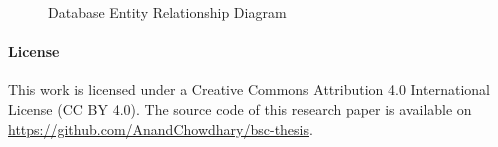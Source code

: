 \documentclass{article}
\begin{document}
\begin{figure}[!hb]
  \caption{Database Entity Relationship Diagram}
\end{figure}

\newpage



\paragraph{License} This work is licensed under a Creative Commons Attribution 4.0 International License (CC BY 4.0). The source code of this research paper is available on \url{https://github.com/AnandChowdhary/bsc-thesis}.
\end{document}
